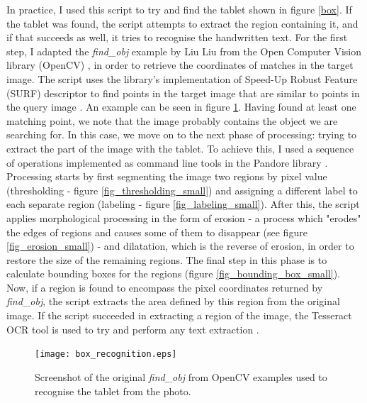\documentclass [12pt,a4paper]{report}
\begin{document}
In practice, I used this script to try and find the tablet shown in figure \ref{box}. If the tablet was found, the script attempts to extract the region containing it, and if that succeeds as well, it tries to recognise the handwritten text. For the first step, I adapted the \textit{find\_obj} example by Liu Liu from the Open Computer Vision library (OpenCV) \cite{opencv}, in order to retrieve the coordinates of matches in the target image. The script uses the library's implementation of Speed-Up Robust Feature (SURF) descriptor to find points in the target image that are similar to points in the query image \cite{bay2006surf}. An example can be seen in figure \ref{box_recognition}. Having found at least one matching point, we note that the image probably contains the object we are searching for. In this case, we move on to the next phase of processing: trying to extract the part of the image with the tablet.
To achieve this, I used a sequence of operations implemented as command line tools in the Pandore library \cite{pandore}. Processing starts by first segmenting the image two regions by pixel value (thresholding - figure \ref{fig_thresholding_small}) and assigning a different label to each separate region (labeling - figure \ref{fig_labeling_small}). After this, the script applies morphological processing in the form of erosion - a process which "erodes" the edges of regions and causes some of them to disappear (see figure \ref{fig_erosion_small}) - and dilatation, which is the reverse of erosion, in order to restore the size of the remaining regions. The final step in this phase is to calculate bounding boxes for the regions (figure \ref{fig_bounding_box_small}). Now, if a region is found to encompass the pixel coordinates returned by \textit{find\_obj}, the script extracts the area defined by this region from the original image.
If the script succeeded in extracting a region of the image, the Tesseract OCR tool is used to try and perform any text extraction \cite{tesseract}. 


\begin{center}
\begin{figure}[h]
\centering
\texttt{[image: box\_recognition.eps]} %
\caption[Screenshot of \textit{find\_obj}]{Screenshot of the original \textit{find\_obj} from OpenCV examples used to recognise the tablet from the photo.}
\label{box_recognition}
\end{figure}
\end{center}
\end{document}
